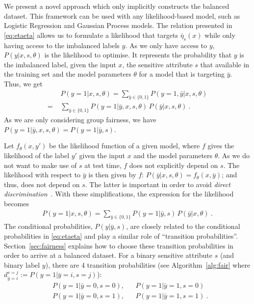 We present a novel approach which only implicitly constructs the balanced dataset.
This framework can be used with any likelihood-based model, such as Logistic Regression and Gaussian Process models.
The relation presented in \eqref{eq:etaeta} allows us to formulate a likelihood
that targets $\bar{\eta}_s(x)$ while only having access to the imbalanced labels $y$.
As we only have access to $y$, $P(y|x,s,\theta)$ is the likelihood to optimise.
It represents the probability that $y$ is the imbalanced label,
given the input $x$, the sensitive attribute $s$ that available in the training set
and the model parameters $\theta$ for a model that is targeting $\bar{y}$.
Thus, we get
\begin{align}
  &P(y=1|x, s, \theta)
  = \sum\limits_{\bar{y}\in \{0, 1\}} P(y=1,\bar{y}|x, s, \theta) \nonumber\\
  =\,\, &\sum\limits_{\bar{y}\in \{0, 1\}} P(y=1|\bar{y}, x, s, \theta)\,P(\bar{y}|x, s, \theta) \label{eq:lik}~.
\end{align}
As we are only considering group fairness, we have $P(y=1|\bar{y}, x, s, \theta)=P(y=1|\bar{y}, s)$.

Let $f_\theta(x, y\prime)$ be the likelihood function of a given model,
where $f$ gives the likelihood of the label $y\prime$ given the input $x$ and the model parameters $\theta$.
As we do not want to make use of $s$ at test time, $f$ does not explicitly depend on $s$.
The likelihood with respect to $\bar{y}$ is then given by $f$: $P(\bar{y}|x, s, \theta) = f_\theta(x, \bar{y})$;
and thus, does not depend on $s$. %
The latter is important in order to avoid \emph{direct discrimination}~\citep{BarSel16}.
With these simplifications, the expression for the likelihood becomes
\begin{align}
  P(y=1|x, s, \theta)
  =\sum\limits_{\bar{y}\in \{0, 1\}} P(y=1|\bar{y}, s)\,P(\bar{y}|x, \theta) \label{eq:lik2}~.
\end{align}
The conditional probabilities, $P(y|\bar{y}, s)$, are closely related to the conditional probabilities in \eqref{eq:etaeta}
and play a similar role of ``transition probabilities''.
Section~\ref{sec:fairness} explains how to choose these transition probabilities in order to arrive at a balanced dataset.
For a binary sensitive attribute $s$ (and binary label $y$), there are 4 transition probabilities
(see Algorithm~\ref{alg:fair} where $d^{s=j}_{\bar{y}=i} := P(y=1|\bar{y}=i, s=j)$):
\begin{align}
  &P(y=1|\bar{y}=0, s=0),  &&P(y=1|\bar{y}=1, s=0) \label{eq:par1}\\
  &P(y=1|\bar{y}=0, s=1),  &&P(y=1|\bar{y}=1, s=1) \label{eq:par4}~.
\end{align}

